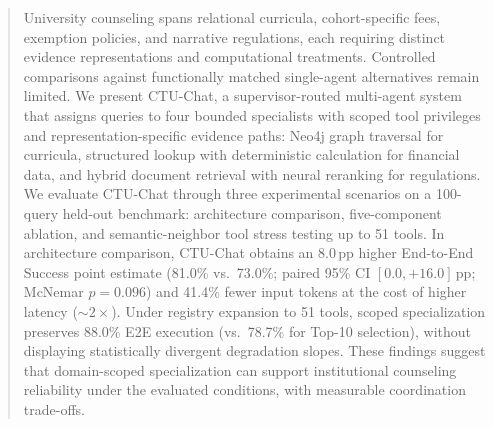 \begin{abstract}
University counseling spans relational curricula, cohort-specific fees, exemption policies, and narrative regulations, each requiring distinct evidence representations and computational treatments. Controlled comparisons against functionally matched single-agent alternatives remain limited. We present CTU-Chat, a supervisor-routed multi-agent system that assigns queries to four bounded specialists with scoped tool privileges and representation-specific evidence paths: Neo4j graph traversal for curricula, structured lookup with deterministic calculation for financial data, and hybrid document retrieval with neural reranking for regulations. We evaluate CTU-Chat through three experimental scenarios on a 100-query held-out benchmark: architecture comparison, five-component ablation, and semantic-neighbor tool stress testing up to 51 tools. In architecture comparison, CTU-Chat obtains an 8.0\,pp higher End-to-End Success point estimate (81.0\% vs.\ 73.0\%; paired 95\% CI $[0.0, +16.0]$\,pp; McNemar $p{=}0.096$) and 41.4\% fewer input tokens at the cost of higher latency ($\sim 2\times$). Under registry expansion to 51 tools, scoped specialization preserves 88.0\% E2E execution (vs.\ 78.7\% for Top-10 selection), without displaying statistically divergent degradation slopes. These findings suggest that domain-scoped specialization can support institutional counseling reliability under the evaluated conditions, with measurable coordination trade-offs.

\end{abstract}
